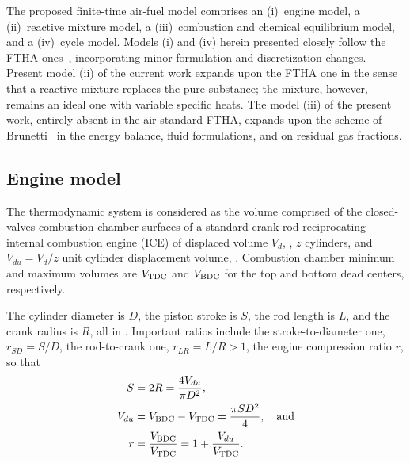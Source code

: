     The proposed finite-time air-fuel model comprises an (i)~engine model, a (ii)~reactive mixture model, a (iii)~combustion and
    chemical equilibrium model, and a  (iv)~cycle  model.  Models  (i)  and  (iv)  herein  presented  closely  follow  the  FTHA
    ones~\cite{2017-NaaktgeborenC-IntJMechEngEduc}, incorporating minor formulation and discretization  changes.  Present  model
    (ii) of the current work expands upon the FTHA one in the sense that a reactive mixture replaces  the  pure  substance;  the
    mixture, however, remains an ideal one with variable specific heats. The model (iii) of the present work, entirely absent in
    the air-standard FTHA, expands upon the scheme  of  Brunetti~\cite{2012-BrunettiF-Blucher}  in  the  energy  balance,  fluid
    formulations, and on residual gas fractions.


    \subsection{Engine model}\label{sec:model.engine}

    The thermodynamic system is considered as the volume comprised  of  the  closed-valves  combustion  chamber  surfaces  of  a
    standard crank-rod reciprocating internal combustion engine (ICE) of displaced volume $V_d$,  \meter\cubed,  $z$  cylinders,
    and $V_{du} = V_d / z$ unit cylinder displacement volume, \meter\cubed. Combustion chamber minimum and maximum  volumes  are
    $V_{\mbox{\scriptsize TDC}}$ and $V_{\mbox{\scriptsize BDC}}$ for the top and bottom dead centers, respectively.

    The cylinder diameter is $D$, the piston stroke is $S$, the rod length is $L$, and the crank radius is $R$, all  in  \meter.
    Important ratios include the stroke-to-diameter one, $r_{SD} = S/D$, the rod-to-crank one, $r_{LR} = L/R >  1$,  the  engine
    compression ratio $r$, so that%
    \begin{align}
        \label{eq:S}
        S       &= 2 R = \frac{4 V_{du}}{\pi D^{2}}, \\
        \label{eq:Vdu}
        V_{du}  &= V_{\mbox{\scriptsize BDC}} - V_{\mbox{\scriptsize TDC}} = \frac{\pi SD^2}{4}, \quad\mbox{and} \\
        \label{eq:r}
        r       &= \frac{V_{\mbox{\scriptsize BDC}}}{V_{\mbox{\scriptsize TDC}}} = 1 + \frac{V_{du}}{V_{\mbox{\scriptsize TDC}}}.
    \end{align}

